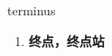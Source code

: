 
\begin{frame}
{\huge terminus}
\begin{center}
\begin{enumerate}\Large
  \item \textbf{终点，终点站}
\end{enumerate}
\end{center}
\end{frame}
